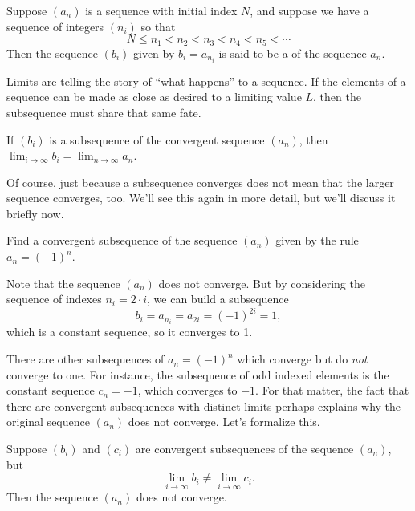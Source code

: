 \documentclass{ximera}
\begin{document}
\begin{definition}
  Suppose $(a_n)$ is a sequence with initial index $N$, and suppose we have a sequence of integers $(n_i)$ so that
  $$
  N \leq n_1 < n_2 < n_3 < n_4 < n_5 < \cdots 
  $$
  Then the sequence $(b_i)$ given by $b_i = a_{n_i}$ is said to be a 
  of the sequence $a_n$.
\end{definition}


Limits are telling the story of ``what happens'' to a sequence.  If
the elements of a sequence can be made as close as desired to a limiting
value $L$, then the subsequence must share that same fate.

\begin{theorem}
  \label{theorem:subsequence-same-limit}
  If $(b_i)$ is a subsequence of the convergent sequence $(a_n)$, then
  $\lim_{i \to \infty} b_i = \lim_{n \to \infty} a_n$.
\end{theorem}

Of course, just because a subsequence converges does not mean that the
larger sequence converges, too.  We'll see this again in more detail,
but we'll discuss it briefly now.

\begin{example}
Find a convergent subsequence of the sequence $(a_n)$ given by the rule $a_n = (-1)^n$.
\end{example}

\begin{explanation}
Note that the sequence $(a_n)$ does not converge.  But by considering the sequence of indexes $n_i = 2 \cdot i$, we can build a subsequence
$$
b_i = a_{n_i} = a_{2i} = (-1)^{2i} = 1,
$$
which is a constant sequence, so it converges to 1.
\end{explanation}

There are other subsequences of $a_n = (-1)^n$ which converge but do
\textit{not} converge to one.  For instance, the subsequence of odd
indexed elements is the constant sequence $c_n = -1$, which converges to
$-1$.  For that matter, the fact that there are convergent
subsequences with distinct limits perhaps explains why the original
sequence $(a_n)$ does not converge.  Let's formalize this.

\begin{corollary}
  \label{corollary:different-subsequences-then-diverge}

  Suppose $(b_i)$ and $(c_i)$ are convergent subsequences of the sequence $(a_n)$, but
  $$
  \lim_{i \to \infty} b_i \neq \lim_{i \to \infty} c_i.
  $$
  Then the sequence $(a_n)$ does not converge.
\end{corollary}
\end{document}
